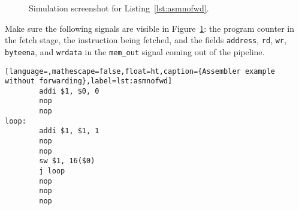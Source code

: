 
\begin{figure}[ht!]
  \centering
  \caption{Simulation screenshot for Listing~\ref{lst:asmnofwd}.}
  \label{fig:sim}
\end{figure}

Make sure the following signals are visible in Figure~\ref{fig:sim}:
the program counter in the fetch stage, the instruction being fetched,
and the fields \texttt{address}, \texttt{rd}, \texttt{wr},
\texttt{byteena}, and \texttt{wrdata} in the \texttt{mem\_out} signal
coming out of the pipeline.

\begin{lstlisting}[language=,mathescape=false,float=ht,caption={Assembler example without forwarding},label=lst:asmnofwd]
        addi $1, $0, 0
        nop
        nop
loop:
        addi $1, $1, 1
        nop
        nop
        sw $1, 16($0)
        j loop
        nop
        nop
        nop
\end{lstlisting}



